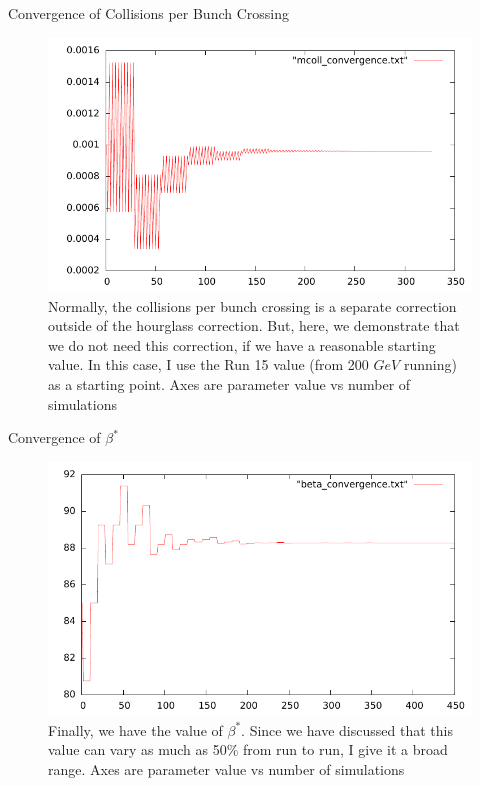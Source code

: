 \begin{frame}{Convergence of Collisions per Bunch Crossing}
\begin{figure}
\begin{center}
\includegraphics[width=0.8\linewidth]{../RootFinding/figs/multicol.pdf}
\end{center}
\caption{Normally, the collisions per bunch crossing is a separate correction
outside of the hourglass correction. But, here, we demonstrate that we do not
need this correction, if we have a reasonable starting value. In this case, I
use the Run 15 value (from 200 $GeV$ running) as a starting point. Axes are
parameter value vs number of simulations}
\label{fig:multi_359711_convergence}
\end{figure}
\end{frame}

\begin{frame}{ Convergence of $\beta^{*}$ }
\begin{figure}
\begin{center}
\includegraphics[width=0.8\linewidth]{../RootFinding/figs/beta.pdf}
\end{center}
\caption{Finally, we have the value of $\beta^{*}$. Since we have discussed that
this value can vary as much as 50\% from run to run, I give it a broad
range. Axes are parameter value vs number of simulations}
\label{fig:beta_359711_convergence}
\end{figure}
\end{frame}

